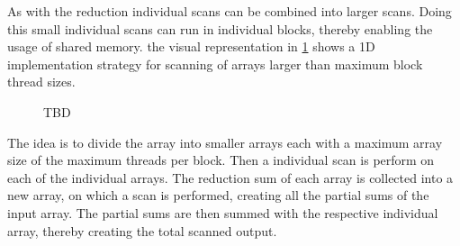 As with the reduction individual scans can be combined into larger scans. Doing this small individual scans can run in individual blocks, thereby enabling the usage of shared memory. the visual representation in \cref{fig:scan_blocking} shows a 1D implementation strategy for scanning of arrays larger than maximum block thread sizes.

\begin{figure}[ht]
	\centering
	\caption{TBD}
	\label{fig:scan_blocking}
\end{figure}

The idea is to divide the array into smaller arrays each with a maximum array size of the maximum threads per block. Then a individual scan is perform on each of the individual arrays. The reduction sum of each array is collected into a new array, on which a scan is performed, creating all the partial sums of the input array. The partial sums are then summed with the respective individual array, thereby creating the total scanned output. 